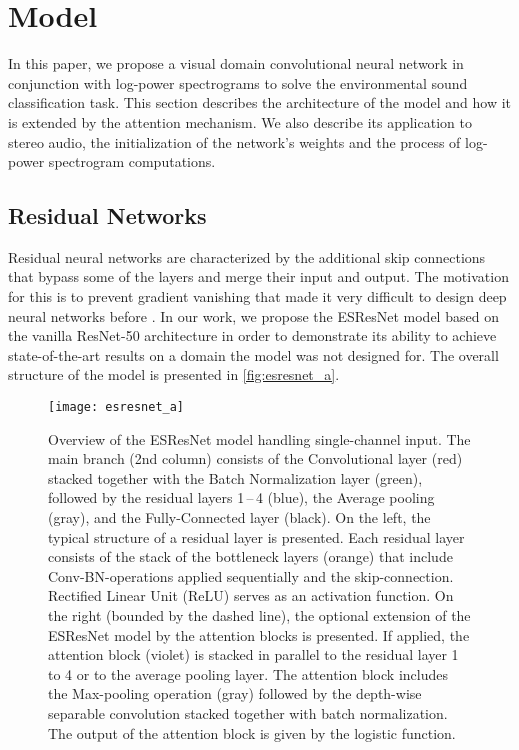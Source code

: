 \documentclass[a4paper,conference]{IEEEtran}
\begin{document}
\section{Model} \label{sec:model}

In this paper, we propose a visual domain convolutional neural network in conjunction with log-power spectrograms to solve the environmental sound classification task.
This section describes the architecture of the model and how it is extended by the attention mechanism.
We also describe its application to stereo audio, the initialization of the network's weights and the process of log-power spectrogram computations.

\subsection{Residual Networks} \label{ssec:resnet}
Residual neural networks are characterized by the additional skip connections that bypass some of the layers and merge their input and output.
The motivation for this is to prevent gradient vanishing that made it very difficult to design deep neural networks before \cite{he2016resnet}.
In our work, we propose the \mbox{ESResNet} model based on the vanilla \mbox{ResNet-50} architecture in order to demonstrate its ability to achieve \mbox{state-of-the-art} results on a domain the model was not designed for.
The overall structure of the model is presented in \autoref{fig:esresnet_a}.

\begin{figure}[hbt]
\centering
\texttt{[image: esresnet\_a]}
\caption{Overview of the ESResNet model handling single-channel input. The main branch (2nd column) consists of the Convolutional layer (red) stacked together with the Batch Normalization layer (green), followed by the residual layers 1\,--\,4 (blue), the Average pooling (gray), and the Fully-Connected layer (black). On the left, the typical structure of a residual layer is presented. Each residual layer consists of the stack of the bottleneck layers (orange) that include \mbox{Conv-BN}-operations applied sequentially and the skip-connection. Rectified Linear Unit (ReLU) serves as an activation function. On the right (bounded by the dashed line), the optional extension of the \mbox{ESResNet} model by the attention blocks is presented. If applied, the attention block (violet) is stacked in parallel to the residual layer 1 to 4 or to the average pooling layer. The attention block includes the Max-pooling operation (gray) followed by the depth-wise separable convolution stacked together with batch normalization. The output of the attention block is given by the logistic function.}
\label{fig:esresnet_a}
\end{figure}
\end{document}
